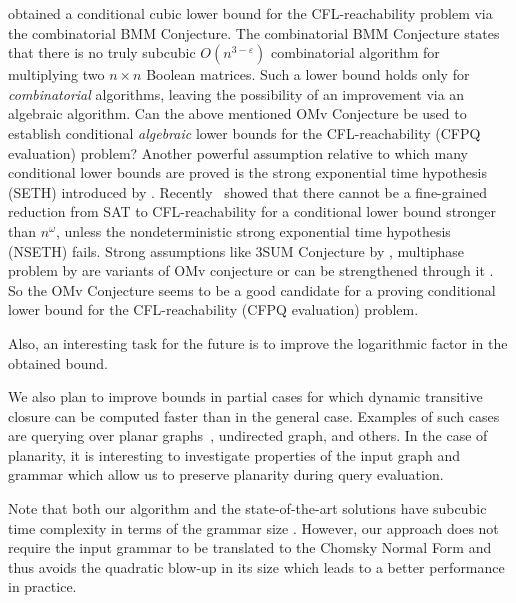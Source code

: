 \cite{10.1145/3158118} obtained a conditional cubic lower bound for the CFL-reachability problem via the combinatorial BMM Conjecture. The combinatorial BMM Conjecture states that there is no truly subcubic $O(n^{3-\varepsilon})$ combinatorial algorithm for multiplying two $n \times n$ Boolean matrices. Such a lower bound holds only for \textit{combinatorial} algorithms, leaving the possibility of an improvement via
an algebraic algorithm. Can the above mentioned OMv Conjecture be used to establish conditional \textit{algebraic} lower bounds for the CFL-reachability (CFPQ evaluation) problem? Another powerful assumption relative to which many conditional lower bounds are proved is the strong exponential time hypothesis (SETH) introduced by \cite{IMPAGLIAZZO2001367}. Recently~\cite{chistikov2021subcubic} showed that there cannot be a fine-grained reduction from SAT to CFL-reachability for a conditional lower bound stronger than $n^{\omega}$, unless the nondeterministic strong exponential time hypothesis (NSETH) fails. Strong assumptions like 3SUM Conjecture by \cite{Gajentaan1995OnAC}, multiphase problem by \cite{Patrascu} are variants of OMv conjecture or can be strengthened through it \cite{10.1145/2746539.2746609}. So the OMv Conjecture seems to be a good candidate for a proving conditional lower bound for the CFL-reachability (CFPQ evaluation) problem.


Also, an interesting task for the future is to improve the logarithmic factor in the obtained bound.


We also plan to improve bounds in partial cases for which dynamic transitive closure can be computed faster than in the general case.
Examples of such cases are querying over planar graphs~\cite{10.1007/3-540-57273-2_72}, undirected graph, and others.
In the case of planarity, it is interesting to investigate properties of the input graph and grammar which allow us to preserve planarity during query evaluation.

Note that both our algorithm and the state-of-the-art solutions have subcubic time complexity in terms of the grammar size \cite{Azimov:2018:CPQ:3210259.3210264, hellingsRelational, hellingsPathQuerying, 10.1145/258994.259006, 10.1145/3398682.3399163}.
However, our approach does not require the input grammar to be translated to the Chomsky Normal Form and thus avoids the quadratic blow-up in its size which leads to a better performance in practice.


